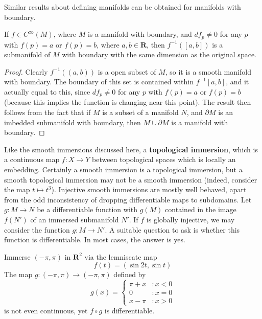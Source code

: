Similar results about defining manifolds can be obtained for manifolds with boundary.

\begin{theorem}
    If $f \in C^\infty(M)$, where $M$ is a manifold with boundary, and $df_p \neq 0$ for any $p$ with $f(p) = a$ or $f(p) = b$, where $a,b \in \mathbf{R}$, then $f^{-1}([a,b])$ is a submanifold of $M$ with boundary with the same dimension as the original space.
\end{theorem}
\begin{proof}
    Clearly $f^{-1}((a,b))$ is a open subset of $M$, so it is a smooth manifold with boundary. The boundary of this set is contained within $f^{-1}[a,b]$, and it actually equal to this, since $df_p \neq 0$ for any $p$ with $f(p) = a$ or $f(p) = b$ (because this implies the function is changing near this point). The result then follows from the fact that if $M$ is a subset of a manifold $N$, and $\partial M$ is an imbedded submanifold with boundary, then $M \cup \partial M$ is a manifold with boundary.
\end{proof}

Like the smooth immersions discussed here, a {\bf topological immersion}, which is a continuous map $f: X \to Y$ between topological spaces which is locally an embedding. Certainly a smooth immersion is a topological immersion, but a smooth topological immersion may not be a smooth immersion (indeed, consider the map $t \mapsto t^3$). Injective smooth immersions are mostly well behaved, apart from the odd inconsistency of dropping differentiable maps to subdomains. Let $g:M \to N$ be a differentiable function with $g(M)$ contained in the image $f(N')$ of an immersed submanifold $N'$. If $f$ is globally injective, we may consider the function $g:M \to N'$. A suitable question to ask is whether this function is differentiable. In most cases, the answer is yes.

\begin{example}
    Immerse $(-\pi, \pi)$ in $\mathbf{R}^2$ via the lemniscate map
    \[ f(t) = (\sin 2t, \sin t) \]
    The map $g:(-\pi, \pi) \to (-\pi, \pi)$ defined by
    \[ g(x) = \begin{cases} \pi + x &: x < 0 \\ 0 &: x = 0 \\ x - \pi &: x > 0 \end{cases} \]
    is not even continuous, yet $f \circ g$ is differentiable.
\end{example}

